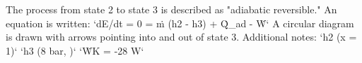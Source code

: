 The process from state 2 to state 3 is described as "adiabatic reversible."  
An equation is written:  
`dE/dt = 0 = ṁ (h2 - h3) + Q̇_ad - Ẇ`  
A circular diagram is drawn with arrows pointing into and out of state 3.  
Additional notes:  
`h2 (x = 1)`  
`h3 (8 bar, )`  
`ẆK = -28 W`